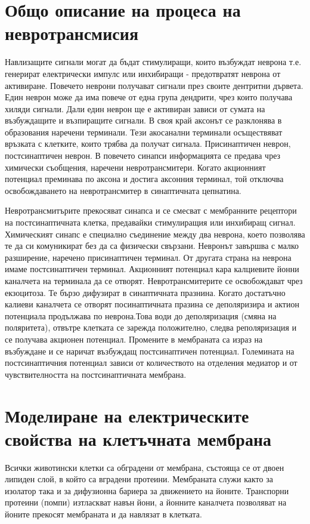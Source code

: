 \documentclass{article}
\begin{document}
\section{Общо описание на процеса на невротрансмисия}
Навлизащите сигнали могат да бъдат стимулиращи, които възбуждат неврона т.е. генерират електрически импулс или инхибиращи - предотвратят неврона от активиране. Повечето неврони получават сигнали през своите дентритни дървета. Един неврон може да има повече от една група дендрити, чрез които получава хиляди сигнали. Дали един неврон ще е активиран зависи от сумата на възбуждащите и възпиращите сигнали.
В своя край аксонът се разклонява в образования наречени терминали. Тези акосанални терминали осъществяват връзката с клетките, които трябва да получат сигнала. Присинаптичен неврон, постсинаптичен неврон. В повечето синапси информацията се предава чрез химически съобщения, наречени невротрансмитери. Когато акционният потенциал преминава по аксона и достига аксонния терминал, той отключва освобождаването на невротрансмитер в синаптичната цепнатина.

Невротрансмитърите прекосяват синапса и се смесват с мембранните рецептори на постсинаптичната клетка, предавайки стимулиращия или инхибиращ сигнал. Химическият синапс е специално съединение между два неврона, което позволява те да си комуникират без да са физически свързани. Невронът завършва с малко разширение, наречено присинаптичен терминал. От другата страна на неврона имаме постсинаптичен терминал. Акционният потенциал кара калциевите йонни каналчета на терминала да се отворят. Невротрансмитерите се освобождават чрез екзоцитоза. Те бързо дифузират в синаптичната празнина. Когато достатъчно калиеви каналчета се отворят посинаптичната празина се деполяризира и актион потенциала продължава по неврона.Това води до деполяризация (смяна на поляритета), отвътре клетката се зарежда положително, следва реполяризация и се получава акционен потенциал. Промените в мембраната  са израз на възбуждане и се наричат възбуждащ постсинаптичен потенциал. Големината на постсинаптичния потенциал зависи от количеството на отделения медиатор и от чувствителността на постсинаптичната мембрана.

\section{Моделиране на електрическите свойства на клетъчната мембрана}
Всички животински клетки са обградени от мембрана, състояща се от двоен липиден слой, в който са вградени протеини. Мембраната служи както за изолатор така и за дифузионна бариера за движението на йоните. Транспорни протеини (помпи) изтласкват навън йони, а йонните каналчета позволяват на йоните прекосят мембраната и да навлязат в клетката. 
\end{document}
